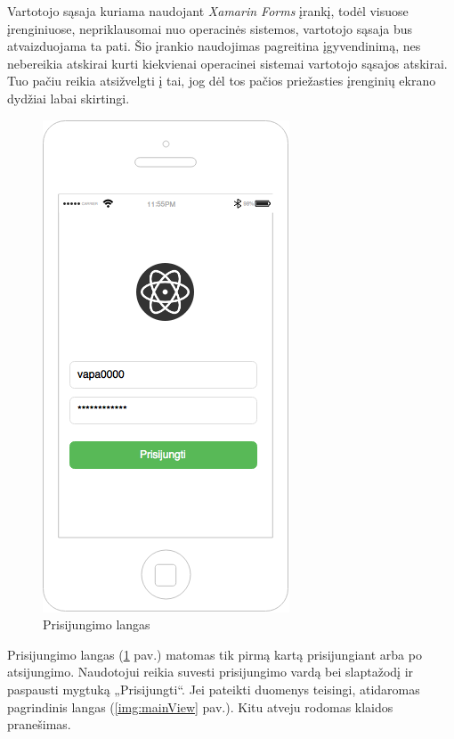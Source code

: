 \documentclass{VUMIFPSkursinis}
\begin{document}
Vartotojo sąsaja kuriama naudojant \textit{Xamarin Forms} įrankį, todėl visuose įrenginiuose, nepriklausomai nuo operacinės sistemos, vartotojo sąsaja bus atvaizduojama ta pati. Šio įrankio naudojimas pagreitina įgyvendinimą, nes nebereikia atskirai kurti kiekvienai operacinei sistemai vartotojo sąsajos atskirai. Tuo pačiu reikia atsižvelgti į tai, jog dėl tos pačios priežasties įrenginių ekrano dydžiai labai skirtingi.

\begin{figure}[H]
	\centering
	\includegraphics[scale=0.5]{img/kursinio_app_login}
	\caption{Prisijungimo langas}
	\label{img:loginView}
\end{figure}

Prisijungimo langas (\ref{img:loginView} pav.) matomas tik pirmą kartą prisijungiant arba po atsijungimo. Naudotojui reikia suvesti prisijungimo vardą bei slaptažodį ir paspausti mygtuką „Prisijungti“. Jei pateikti duomenys teisingi, atidaromas pagrindinis langas (\ref{img:mainView} pav.). Kitu atveju rodomas klaidos pranešimas.
\end{document}
